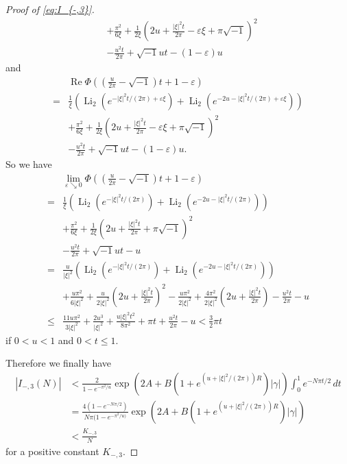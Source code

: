 \documentclass[a4paper]{amsart}
\theoremstyle{plain}
\theoremstyle{definition}
\theoremstyle{remark}
\newcommand{\Li}{\operatorname{Li}}
\renewcommand{\Re}{\operatorname{Re}}
\numberwithin{equation}{section}
\begin{document}
\begin{proof}[Proof of \eqref{eq:I_{-,3}}]
\begin{equation*}
\begin{split}
  &
  +\frac{\pi^2}{6\xi}
  +\frac{1}{2\xi}
  \left(
    2u+\frac{|\xi|^2t}{2\pi}-\varepsilon\xi+\pi\sqrt{-1}
  \right)^2
  \\
  &-\frac{u^2t}{2\pi}+\sqrt{-1}ut-(1-\varepsilon)u
\end{split}
\end{equation*}
and
\begin{equation*}
\begin{split}
  &\Re\Phi\left(\left(\frac{u}{2\pi}-\sqrt{-1}\right)t+1-\varepsilon\right)
  \\
  =&
  \frac{1}{\xi}
  \left(
    \Li_2(e^{-|\xi|^2t/(2\pi)+\varepsilon\xi})
    +
    \Li_2(e^{-2u-|\xi|^2t/(2\pi)+\varepsilon\xi})
  \right)
  \\
  &
  +\frac{\pi^2}{6\xi}
  +\frac{1}{2\xi}
  \left(
    2u+\frac{|\xi|^2t}{2\pi}-\varepsilon\xi+\pi\sqrt{-1}
  \right)^2
  \\
  &-\frac{u^2t}{2\pi}+\sqrt{-1}ut-(1-\varepsilon)u.
\end{split}
\end{equation*}
So we have
\begin{equation*}
\begin{split}
  &\lim_{\varepsilon\searrow0}
  \Phi\left(\left(\frac{u}{2\pi}-\sqrt{-1}\right)t+1-\varepsilon\right)
  \\
  =&
  \frac{1}{\xi}
  \left(
    \Li_2(e^{-|\xi|^2t/(2\pi)})
    +
    \Li_2(e^{-2u-|\xi|^2t/(2\pi)})
  \right)
  \\
  &
  +\frac{\pi^2}{6\xi}
  +\frac{1}{2\xi}
  \left(
    2u+\frac{|\xi|^2t}{2\pi}+\pi\sqrt{-1}
  \right)^2
  \\
  &-\frac{u^2t}{2\pi}+\sqrt{-1}ut-u
  \\
  =&
  \frac{u}{|\xi|^2}
  \left(
    \Li_2(e^{-|\xi|^2t/(2\pi)})
    +
    \Li_2(e^{-2u-|\xi|^2t/(2\pi)})
  \right)
  \\
  &+\frac{u\pi^2}{6|\xi|^2}
  +
  \frac{u}{2|\xi|^2}
  \left(
    2u+\frac{|\xi|^2t}{2\pi}
  \right)^2
  -
  \frac{u\pi^2}{2|\xi|^2}
  +
  \frac{4\pi^2}{2|\xi|^2}
  \left(
    2u+\frac{|\xi|^2t}{2\pi}
  \right)
  -
  \frac{u^2t}{2\pi}
  -u
  \\
  \le
  &\frac{11u\pi^2}{3|\xi|^2}
  +\frac{2u^3}{|\xi|^2}
  +\frac{u|\xi|^2t^2}{8\pi^2}
  +\pi t
  +\frac{u^2t}{2\pi}
  -u
  <\frac{3}{2}\pi t
\end{split}
\end{equation*}
if $0<u<1$ and $0<t\le1$.
\par
Therefore we finally have
\begin{equation*}
\begin{split}
  |I_{-,3}(N)|
  &<
  \frac{2}{1-e^{-\pi^2/u}}
  \exp\left(2A+B(1+e^{(u+|\xi|^2/(2\pi))R})|\gamma|\right)
  \int_{0}^{1}
  e^{-N\pi t/2}
  \,dt
  \\
  &=
  \frac{4(1-e^{-N\pi/2})}{N\pi(1-e^{-\pi^2/u)}}
  \exp\left(2A+B(1+e^{(u+|\xi|^2/(2\pi))R})|\gamma|\right)
  \\
  &<
  \frac{K_{-,3}}{N}
\end{split}
\end{equation*}
for a positive constant $K_{-,3}$.
\end{proof}%
\end{document}
